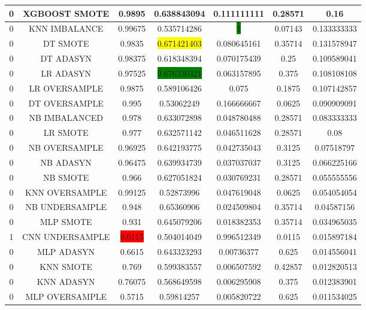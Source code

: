 \begin{longtable}{|c|c|c|c|c|c|c|}
  	0 & XGBOOST SMOTE & 0.9895 & 0.638843094 & 0.111111111 & 0.28571 & 0.16\\ \hline
  	0 & KNN IMBALANCE & 0.99675 & 0.535714286 & \colorbox{green}{1} & 0.07143 & 0.133333333\\ \hline
  	0 & DT SMOTE & 0.9835 & \colorbox{yellow}{0.671421403} & 0.080645161 & 0.35714 & 0.131578947\\ \hline
  	0 & DT ADASYN & 0.98375 & 0.618348394 & 0.070175439 & 0.25 & 0.109589041\\ \hline
  	0 & LR ADASYN  & 0.97525 & \colorbox{green}{0.676330321} & 0.063157895 & 0.375 & 0.108108108\\ \hline
  	0 & LR OVERSAMPLE & 0.9875 & 0.589106426 & 0.075 & 0.1875 & 0.107142857\\ \hline
  	0 & DT OVERSAMPLE & 0.995 & 0.53062249 & 0.166666667 & 0.0625 & 0.090909091\\ \hline
  	0 & NB IMBALANCED & 0.978 & 0.633072898 & 0.048780488 & 0.28571 & 0.083333333\\ \hline
  	0 & LR SMOTE & 0.977 & 0.632571142 & 0.046511628 & 0.28571 & 0.08\\ \hline
  	0 & NB OVERSAMPLE & 0.96925 & 0.642193775 & 0.042735043 & 0.3125 & 0.07518797\\ \hline
  	0 & NB ADASYN & 0.96475 & 0.639934739 & 0.037037037 & 0.3125 & 0.066225166\\ \hline
  	0 & NB SMOTE & 0.966 & 0.627051824 & 0.030769231 & 0.28571 & 0.055555556\\ \hline
  	0 & KNN OVERSAMPLE & 0.99125 & 0.52873996 & 0.047619048 & 0.0625 & 0.054054054\\ \hline
  	0 & NB UNDERSAMPLE & 0.948 & 0.65360906 & 0.024509804 & 0.35714 & 0.04587156\\ \hline
  	0 & MLP SMOTE & 0.931 & 0.645079206 & 0.018382353 & 0.35714 & 0.034965035\\ \hline
  	1 & CNN UNDERSAMPLE & \colorbox{red}{0.0115} & 0.504014049 & 0.996512349 & 0.0115 & 0.015897184\\ \hline
  	0 & MLP ADASYN & 0.6615 & 0.643323293 & 0.00736377 & 0.625 & 0.014556041\\ \hline
  	0 & KNN SMOTE & 0.769 & 0.599383557 & 0.006507592 & 0.42857 & 0.012820513\\ \hline
  	0 & KNN ADASYN & 0.76075 & 0.568649598 & 0.006295908 & 0.375 & 0.012383901\\ \hline
  	0 & MLP OVERSAMPLE & 0.5715 & 0.59814257 & 0.005820722 & 0.625 & 0.011534025\\ \hline

\end{longtable}

